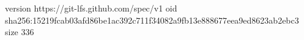 version https://git-lfs.github.com/spec/v1
oid sha256:15219fcab03afd86be1ac392c711f34082a9fb13e888677eea9ed8623ab2ebc3
size 336
